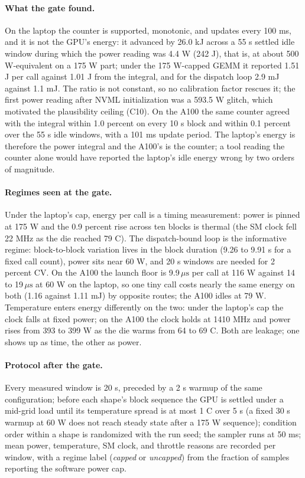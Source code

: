 \documentclass{article}
\newcommand{\us}{\,\mu\mathrm{s}}
\begin{document}
\paragraph{What the gate found.} On the laptop the counter is supported, monotonic, and updates every 100 ms, and it is not the GPU's energy: it advanced by 26.0 kJ across a 55 s settled idle window during which the power reading was 4.4 W (242 J), that is, at about 500 W-equivalent on a 175 W part; under the 175 W-capped GEMM it reported 1.51 J per call against 1.01 J from the integral, and for the dispatch loop 2.9 mJ against 1.1 mJ. The ratio is not constant, so no calibration factor rescues it; the first power reading after NVML initialization was a 593.5 W glitch, which motivated the plausibility ceiling (C10). On the A100 the same counter agreed with the integral within 1.0 percent on every 10 s block and within 0.1 percent over the 55 s idle windows, with a 101 ms update period. The laptop's energy is therefore the power integral and the A100's is the counter; a tool reading the counter alone would have reported the laptop's idle energy wrong by two orders of magnitude.

\paragraph{Regimes seen at the gate.} Under the laptop's cap, energy per call is a timing measurement: power is pinned at 175 W and the 0.9 percent rise across ten blocks is thermal (the SM clock fell 22 MHz as the die reached 79 C). The dispatch-bound loop is the informative regime: block-to-block variation lives in the block duration (9.26 to 9.91 s for a fixed call count), power sits near 60 W, and 20 s windows are needed for 2 percent CV. On the A100 the launch floor is 9.9$\us$ per call at 116 W against 14 to 19$\us$ at 60 W on the laptop, so one tiny call costs nearly the same energy on both (1.16 against 1.11 mJ) by opposite routes; the A100 idles at 79 W. Temperature enters energy differently on the two: under the laptop's cap the clock falls at fixed power; on the A100 the clock holds at 1410 MHz and power rises from 393 to 399 W as the die warms from 64 to 69 C. Both are leakage; one shows up as time, the other as power.

\paragraph{Protocol after the gate.} Every measured window is 20 s, preceded by a 2 s warmup of the same configuration; before each shape's block sequence the GPU is settled under a mid-grid load until its temperature spread is at most 1 C over 5 s (a fixed 30 s warmup at 60 W does not reach steady state after a 175 W sequence); condition order within a shape is randomized with the run seed; the sampler runs at 50 ms; mean power, temperature, SM clock, and throttle reasons are recorded per window, with a regime label (\emph{capped} or \emph{uncapped}) from the fraction of samples reporting the software power cap.
\end{document}
